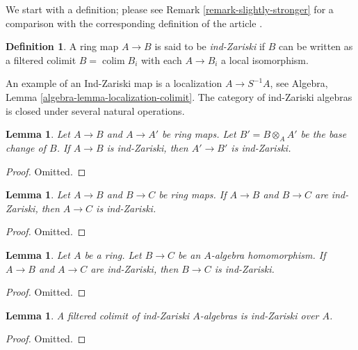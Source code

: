 \documentclass{stacks-project}
\theoremstyle{plain}
\newtheorem{lemma}[subsection]{Lemma}
\theoremstyle{definition}
\newtheorem{definition}[subsection]{Definition}
\theoremstyle{remark}
\numberwithin{equation}{subsection}
\def\colim{\mathop{\mathrm{colim}}\nolimits}
\begin{document}
\noindent
We start with a definition; please see Remark \ref{remark-slightly-stronger}
for a comparison with the corresponding definition of the article \cite{BS}.

\begin{definition}
\label{definition-ind-zariski}
A ring map $A \to B$ is said to be {\it ind-Zariski} if $B$ can be written
as a filtered colimit $B = \colim B_i$ with each $A \to B_i$ a local
isomorphism.
\end{definition}

\noindent
An example of an Ind-Zariski map is a localization $A \to S^{-1}A$, see
Algebra, Lemma \ref{algebra-lemma-localization-colimit}.
The category of ind-Zariski algebras is closed under several natural
operations.

\begin{lemma}
\label{lemma-base-change-ind-zariski}
Let $A \to B$ and $A \to A'$ be ring maps. Let $B' = B \otimes_A A'$
be the base change of $B$.
If $A \to B$ is ind-Zariski, then $A' \to B'$ is ind-Zariski.
\end{lemma}

\begin{proof}
Omitted.
\end{proof}

\begin{lemma}
\label{lemma-composition-ind-zariski}
Let $A \to B$ and $B \to C$ be ring maps. If $A \to B$ and $B \to C$
are ind-Zariski, then $A \to C$ is ind-Zariski.
\end{lemma}

\begin{proof}
Omitted.
\end{proof}

\begin{lemma}
\label{lemma-ind-zariski-permanence}
Let $A$ be a ring. Let $B \to C$ be an $A$-algebra homomorphism.
If $A \to B$ and $A \to C$ are ind-Zariski, then $B \to C$
is ind-Zariski.
\end{lemma}

\begin{proof}
Omitted.
\end{proof}

\begin{lemma}
\label{lemma-ind-ind-zariski}
A filtered colimit of ind-Zariski $A$-algebras is ind-Zariski over $A$.
\end{lemma}

\begin{proof}
Omitted.
\end{proof}
\end{document}
